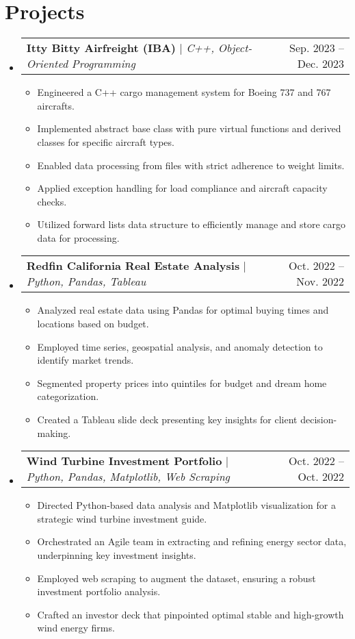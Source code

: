 \documentclass[letterpaper,11pt]{article}
\makeatletter
\newcommand{\resumeItem}[1]{\item\small{{#1 \vspace{-2pt}}}}
\newcommand{\resumeProjectHeading}[2]{\item\begin{tabular*}{0.97\textwidth}{l@{\extracolsep{\fill}}r}\small#1 & #2 \end{tabular*}\vspace{-7pt}}
\newcommand{\smallbullet}{\raisebox{0.3ex}{\scalebox{0.7}{$\bullet$}}} %
\newenvironment{resumeSubHeadingList}{\begin{itemize}[leftmargin=0.15in, label={}]}{\end{itemize}}
\newenvironment{resumeItemList}{\begin{itemize}[label=\smallbullet]}{\end{itemize}\vspace{-5pt}}
\makeatother
\begin{document}
    \section{Projects}
    \label{sec:projects}
    \begin{resumeSubHeadingList}
        \resumeProjectHeading
        {\textbf{Itty Bitty Airfreight (IBA)} $|$ \emph{C++, Object-Oriented Programming}}{Sep. 2023 -- Dec. 2023}
        \begin{resumeItemList}
            \resumeItem{Engineered a C++ cargo management system for Boeing 737 and 767 aircrafts.}
            \resumeItem{Implemented abstract base class with pure virtual functions and derived classes for specific aircraft types.}
            \resumeItem{Enabled data processing from files with strict adherence to weight limits.}
            \resumeItem{Applied exception handling for load compliance and aircraft capacity checks.}
            \resumeItem{Utilized forward lists data structure to efficiently manage and store cargo data for processing.}
        \end{resumeItemList}

        \resumeProjectHeading
        {\textbf{Redfin California Real Estate Analysis} $|$ \emph{Python, Pandas, Tableau}}{Oct. 2022 -- Nov. 2022}
        \begin{resumeItemList}
            \resumeItem{Analyzed real estate data using Pandas for optimal buying times and locations based on budget.}
            \resumeItem{Employed time series, geospatial analysis, and anomaly detection to identify market trends.}
            \resumeItem{Segmented property prices into quintiles for budget and dream home categorization.}
            \resumeItem{Created a Tableau slide deck presenting key insights for client decision-making.}
        \end{resumeItemList}

        \resumeProjectHeading
        {\textbf{Wind Turbine Investment Portfolio} $|$ \emph{Python, Pandas, Matplotlib, Web Scraping}}{Oct. 2022 -- Oct. 2022}
        \begin{resumeItemList}
            \resumeItem{Directed Python-based data analysis and Matplotlib visualization for a strategic wind turbine investment guide.}
            \resumeItem{Orchestrated an Agile team in extracting and refining energy sector data, underpinning key investment insights.}
            \resumeItem{Employed web scraping to augment the dataset, ensuring a robust investment portfolio analysis.}
            \resumeItem{Crafted an investor deck that pinpointed optimal stable and high-growth wind energy firms.}
        \end{resumeItemList}


\end{resumeSubHeadingList}
\end{document}
